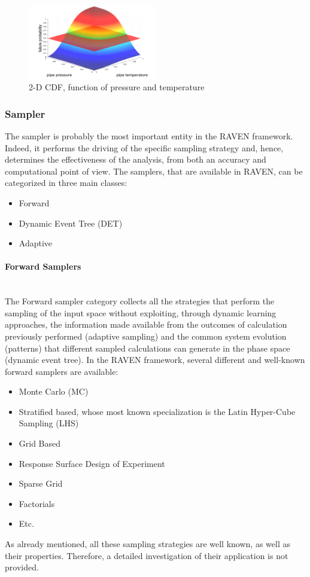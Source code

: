 \begin{figure}
  \centering
  \includegraphics[width=0.5\textwidth]  {pics/NDimensionalDistributionExample.png}
  \caption{2-D CDF, function of pressure and temperature}
  \label{fig:NDDistributionExample}
\end{figure}

\subsubsection{Sampler}

The sampler is probably the most important entity in the RAVEN framework. Indeed, it performs the driving of the specific sampling strategy and, hence, determines the effectiveness of the analysis, from both an accuracy and computational point of view.  The samplers, that are available in RAVEN, can be categorized in three main classes:
\begin{itemize}
 \item Forward
 \item Dynamic Event Tree (DET)
 \item Adaptive
\end{itemize}
\paragraph{Forward Samplers} ~\\ 
The Forward sampler category collects all the strategies that perform the sampling of the input space without exploiting, through dynamic learning approaches, the information made available from the outcomes of calculation previously performed (adaptive sampling) and the common system evolution (patterns) that different sampled calculations can generate in the phase space (dynamic event tree). 
In the RAVEN framework, several different and well-known forward samplers are available:
\begin{itemize}
\item Monte Carlo (MC)
\item Stratified based, whose most known specialization is the Latin Hyper-Cube Sampling (LHS)
\item Grid Based
\item Response Surface Design of Experiment
\item Sparse Grid
\item Factorials
\item Etc.
\end{itemize}
As already mentioned, all these sampling strategies are well known, as well as their properties. Therefore, a detailed investigation of their application is not provided.

